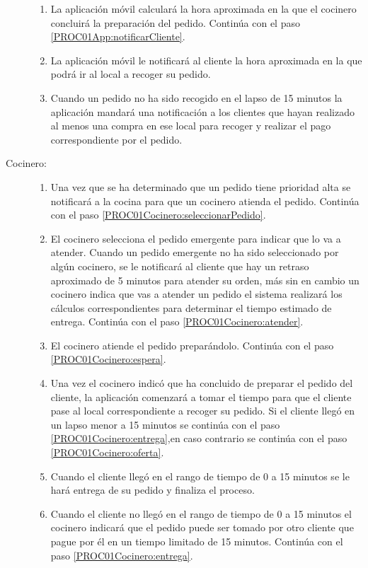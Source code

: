 \begin{description}
\begin{enumerate}
			\item \label{PROC01App:calcularHoraFinalizacion} \task La aplicación móvil calculará la hora aproximada en la que el cocinero concluirá la preparación del pedido. Continúa con el paso \ref{PROC01App:notificarCliente}.
			\item \label{PROC01App:notificarCliente} \task La aplicación móvil le notificará al cliente la hora aproximada en la que podrá ir al local a recoger su pedido.
			\item \label{PROC01App:pedidoNoEntregado} Cuando un pedido no ha sido recogido en el lapso de 15 minutos la aplicación mandará una notificación a los clientes que hayan realizado al menos una compra en ese local para recoger y realizar el pago correspondiente por el pedido.
		\end{enumerate}

	\item[Cocinero:]\hspace{1pt}
		\begin{enumerate}
			\item \label{PROC01Cocinero:notif} Una vez que se ha determinado que un pedido tiene prioridad alta se notificará a la cocina para que un cocinero atienda el pedido. Continúa con el paso \ref{PROC01Cocinero:seleccionarPedido}.
			\item \label{PROC01Cocinero:seleccionarPedido} \task El cocinero selecciona el pedido emergente para indicar que lo va a atender. Cuando un pedido emergente no ha sido seleccionado por algún cocinero, se le notificará al cliente que hay un retraso aproximado de 5 minutos para atender su orden, más sin en cambio un cocinero indica que vas a atender un pedido el sistema realizará los cálculos correspondientes para determinar el tiempo estimado de entrega. Continúa con el paso \ref{PROC01Cocinero:atender}.
			\item \label{PROC01Cocinero:atender} \task El cocinero atiende el pedido preparándolo. Continúa con el paso \ref{PROC01Cocinero:espera}.
			\item \label{PROC01Cocinero:espera} \task Una vez el cocinero indicó que ha concluido de preparar el pedido del cliente, la aplicación comenzará a tomar el tiempo para que el cliente pase al local correspondiente a recoger su pedido. Si el cliente llegó en un lapso menor a 15 minutos se continúa con el paso \ref{PROC01Cocinero:entrega},en caso contrario se continúa con el paso \ref{PROC01Cocinero:oferta}.
			\item  \label{PROC01Cocinero:entrega} \task Cuando el cliente llegó en el rango de tiempo de 0 a 15 minutos se le hará entrega de su pedido y finaliza el proceso.
			\item \label{PROC01Cocinero:oferta} \task Cuando el cliente no llegó en el rango de tiempo de 0 a 15 minutos el cocinero indicará que el pedido puede ser tomado por otro cliente que pague por él en un tiempo limitado de 15 minutos. Continúa con el paso \ref{PROC01Cocinero:entrega}.
		\end{enumerate}

\end{description}


